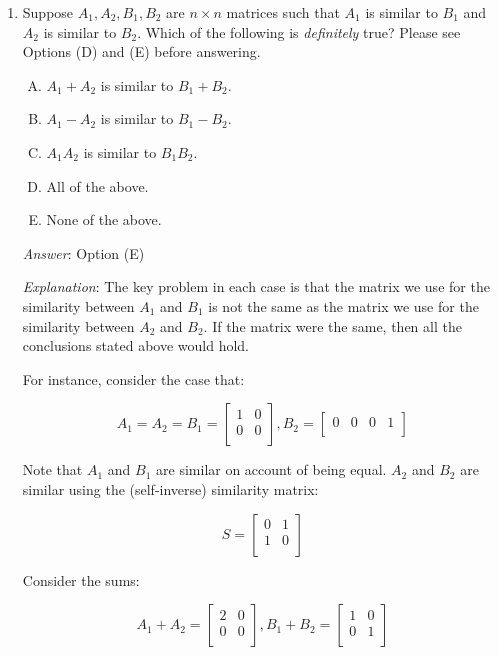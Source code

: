 \documentclass[10pt]{amsart}
\begin{document}
\begin{enumerate}
  {\em Historical note (last time)}: $11$ out of $19$ got this. $4$ chose (D),
  $2$ each chose (B) and (E).


\item Suppose $A_1,A_2,B_1,B_2$ are $n \times n$ matrices such that
  $A_1$ is similar to $B_1$ and $A_2$ is similar to $B_2$. Which of
  the following is {\em definitely} true? Please see Options (D) and
  (E) before answering.

  \begin{enumerate}[(A)]
  \item $A_1 + A_2$ is similar to $B_1 + B_2$.
  \item $A_1 - A_2$ is similar to $B_1 - B_2$.
  \item $A_1A_2$ is similar to $B_1B_2$.
  \item All of the above.
  \item None of the above.
  \end{enumerate}

  {\em Answer}: Option (E)

  {\em Explanation}: The key problem in each case is that the matrix
  we use for the similarity between $A_1$ and $B_1$ is not the same as
  the matrix we use for the similarity between $A_2$ and $B_2$. If the
  matrix were the same, then all the conclusions stated above would hold.

  For instance, consider the case that:

  $$A_1 = A_2 = B_1 = \left[ \begin{matrix} 1 & 0 \\ 0 & 0 \\\end{matrix}\right], B_2 = \left[ \begin{matrix} 0 & 0 & 0 & 1 \\\end{matrix}\right]$$

  Note that $A_1$ and $B_1$ are similar on account of being
  equal. $A_2$ and $B_2$ are similar using the (self-inverse)
  similarity matrix:

  $$S = \left[\begin{matrix} 0 & 1 \\ 1 & 0 \\\end{matrix}\right]$$

  Consider the sums:

  $$A_1 + A_2 = \left[\begin{matrix} 2 & 0 \\ 0 & 0 \\\end{matrix}\right], B_1 + B_2 = \left[\begin{matrix} 1 & 0 \\ 0 & 1 \\\end{matrix}\right]$$


\end{enumerate}
\end{document}
